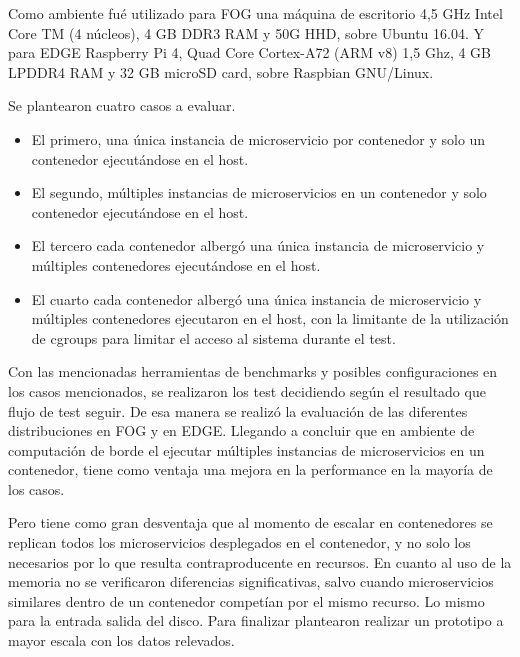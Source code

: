  Como ambiente fué utilizado para FOG una máquina de escritorio 4,5 GHz Intel Core TM (4 núcleos),
 4 GB DDR3 RAM y 50G HHD, sobre Ubuntu 16.04. Y para EDGE Raspberry Pi 4, Quad Core Cortex-A72 (ARM v8) 1,5 Ghz,
 4 GB LPDDR4 RAM y 32 GB microSD card, sobre Raspbian GNU/Linux. 

 Se plantearon cuatro casos a evaluar.
 \begin{itemize}
     \item El primero, una única instancia de microservicio por contenedor y solo un contenedor ejecutándose en el host.
     \item El segundo, múltiples instancias de microservicios en un contenedor y solo contenedor ejecutándose en el host. 
     \item El tercero cada contenedor albergó una única instancia de microservicio y múltiples contenedores ejecutándose en el host.
     \item El cuarto cada contenedor albergó una única instancia de microservicio y múltiples contenedores ejecutaron en el host, 
     con la limitante de la utilización de cgroups para limitar el acceso al sistema durante el test.
 \end{itemize}
 
 Con las mencionadas herramientas de benchmarks y posibles configuraciones en los casos mencionados,
 se realizaron los test decidiendo según el resultado que flujo de test seguir.
 De esa manera se realizó la evaluación de las diferentes distribuciones en FOG y en EDGE. 
 Llegando a concluir que en ambiente de computación de borde el ejecutar múltiples instancias de microservicios en un contenedor,
 tiene como ventaja una mejora en la performance en la mayoría de los casos.

 Pero tiene como gran desventaja que al momento de escalar en contenedores se replican todos los microservicios desplegados en el contenedor, 
 y no solo los necesarios por lo que resulta contraproducente en recursos. 
 En cuanto al uso de la memoria no se verificaron diferencias significativas, 
 salvo cuando microservicios similares dentro de un contenedor competían por el mismo recurso. 
 Lo mismo para la entrada salida del disco. Para finalizar plantearon realizar un prototipo a mayor escala con los datos relevados.
